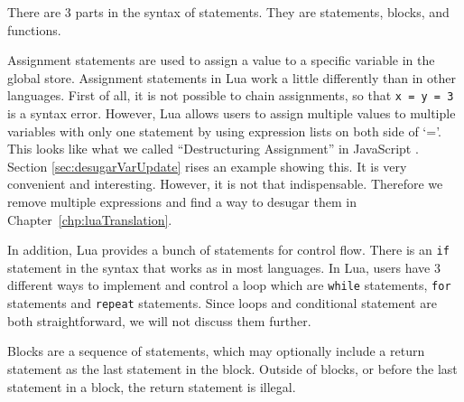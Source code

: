 There are 3 parts in the syntax of statements.
They are statements, blocks, and functions.

Assignment statements are used to assign a value to a specific variable in the global store.
Assignment statements in Lua work a little differently than in other languages.
First of all, it is not possible to chain assignments, so that {\tt x = y = 3} is a syntax error.
However, Lua allows users to assign multiple values to multiple variables with only one statement by using expression lists on both side of `='. 
This looks like what we called ``Destructuring Assignment'' in JavaScript \cite{DA}. 
Section \ref{sec:desugarVarUpdate} rises an example showing this. It is very convenient and interesting. 
However, it is not that indispensable. Therefore we remove multiple expressions and find a way to desugar them in Chapter~\ref{chp:luaTranslation}.

In addition, Lua provides a bunch of statements for control flow. There is an {\tt if} statement in the syntax that works as in most languages.
In Lua, users have 3 different ways to implement and control a loop which are {\tt while} statements, {\tt for} statements and {\tt repeat} statements. Since loops and conditional statement are both straightforward, we will not discuss them further.

Blocks are a sequence of statements,
which may optionally include a return statement as the last statement in the block.
Outside of blocks, or before the last statement in a block,
the return statement is illegal.

\newcommand{\assign}[2]{{\overline{#1_i}}~{=}~{\overline{#2_j}}}
\newcommand{\doe}[1]{\mbox{\tt do}~#1~{\tt end}}
\newcommand{\ife}[3]{\mbox{\tt if}~{#1}~\mbox{\tt then}~{#2}~\mbox{\tt else}~{#3}~{\tt end}}
\newcommand{\whilee}[2]{\mbox{\tt while}~#1~{\tt do}~#2~{\tt end}}
\newcommand{\repeate}[2]{\mbox{\tt repeat}~#2~{\tt until}~#1~}
\newcommand{\for}[3]{\mbox{\tt for}~#1~=~#2_1,~#2_2,~#2_3~{\tt do}~#3~{\tt end}}
\newcommand{\function}[3]{\mbox{\tt function}~#1({\overline{#2_i}})~#3~{\tt end}}
\newcommand{\local}[2]{\mbox{\tt local}~{\assign #1 #2}}

